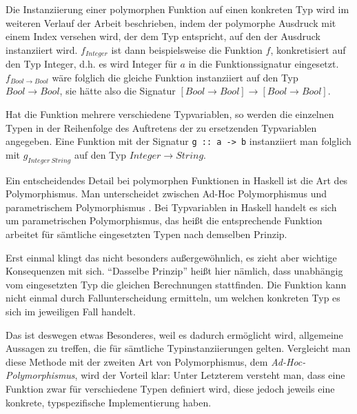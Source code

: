 Die Instanziierung einer polymorphen Funktion auf einen konkreten Typ wird im weiteren Verlauf der Arbeit beschrieben, indem der
polymorphe Ausdruck mit einem Index versehen wird, der dem Typ entspricht, auf den der Ausdruck instanziiert wird.
$f_{Integer}$ ist dann beispielsweise die Funktion $f$, konkretisiert auf den Typ Integer, d.h. es wird Integer
für $a$ in die Funktionssignatur eingesetzt. $f_{Bool \rightarrow Bool}$ wäre folglich die gleiche Funktion instanziiert auf den Typ
$Bool \rightarrow Bool$, sie hätte also die Signatur $[Bool \rightarrow Bool] \rightarrow [Bool \rightarrow Bool]$.

Hat die Funktion mehrere verschiedene Typvariablen, so werden die einzelnen Typen
in der Reihenfolge des Auftretens der zu ersetzenden Typvariablen angegeben. Eine Funktion mit der Signatur \texttt{g :: a -> b} instanziiert man
folglich mit $g_{Integer\ String}$ auf den Typ $Integer \rightarrow String$.


Ein entscheidendes Detail bei polymorphen Funktionen in Haskell ist die Art des Polymorphismus.
Man unterscheidet zwischen Ad-Hoc Polymorphismus und parametrischem Poly\-mor\-phis\-mus . Bei Typvariablen
in Haskell handelt es sich um parametrischen Polymorphismus, das heißt die entsprechende Funktion arbeitet für sämtliche
eingesetzten Typen nach demselben Prinzip.

Erst einmal klingt das nicht besonders außergewöhnlich, es zieht aber wichtige
Konsequenzen mit sich. ``Dasselbe Prinzip'' heißt hier nämlich, dass unabhängig vom eingesetzten Typ die gleichen
Berechnungen stattfinden. Die Funktion kann nicht einmal
durch Fallunterscheidung ermitteln, um welchen konkreten Typ es sich im jeweiligen Fall handelt.

Das ist deswegen etwas Besonderes, weil es dadurch ermöglicht wird, allgemeine Aussagen zu treffen, die für sämtliche
Typinstanziierungen gelten. Vergleicht man diese Methode mit der zweiten Art von Polymorphismus, dem \textit{Ad-Hoc-Polymorphismus},
wird der Vorteil klar: Unter Letzterem versteht man, dass eine Funktion zwar für verschiedene Typen definiert wird, diese jedoch
jeweils eine konkrete, typspezifische Implementierung haben.

